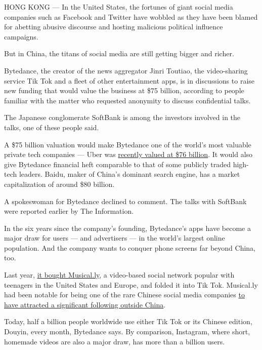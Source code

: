 HONG KONG --- In the United States, the fortunes of giant social media
companies such as Facebook and Twitter have wobbled as they have been
blamed for abetting abusive discourse and hosting malicious political
influence campaigns.

But in China, the titans of social media are still getting bigger and
richer.

Bytedance, the creator of the news aggregator Jinri Toutiao, the
video-sharing service Tik Tok and a fleet of other entertainment apps,
is in discussions to raise new funding that would value the business at
\$75 billion, according to people familiar with the matter who requested
anonymity to discuss confidential talks.

The Japanese conglomerate SoftBank is among the investors involved in
the talks, one of these people said.

A \$75 billion valuation would make Bytedance one of the world's most
valuable private tech companies --- Uber was
\href{https://www.nytimes.com/2018/08/27/technology/uber-toyota-partnership.html}{recently
valued at \$76 billion}. It would also give Bytedance financial heft
comparable to that of some publicly traded high-tech leaders. Baidu,
maker of China's dominant search engine, has a market capitalization of
around \$80 billion.

A spokeswoman for Bytedance declined to comment. The talks with SoftBank
were reported earlier by The Information.

In the six years since the company's founding, Bytedance's apps have
become a major draw for users --- and advertisers --- in the world's
largest online population. And the company wants to conquer phone
screens far beyond China, too.

Last year,
\href{https://www.nytimes.com/2017/11/10/business/dealbook/musically-sold-app-video.html}{it
bought Musical.ly}, a video-based social network popular with teenagers
in the United States and Europe, and folded it into Tik Tok. Musical.ly
had been notable for being one of the rare Chinese social media
companies
\href{https://www.nytimes.com/2016/08/10/technology/china-homegrown-internet-companies-rest-of-the-world.html}{to
have attracted a significant following outside China}.

Today, half a billion people worldwide use either Tik Tok or its Chinese
edition, Douyin, every month, Bytedance says. By comparison, Instagram,
where short, homemade videos are also a major draw, has more than a
billion users.

